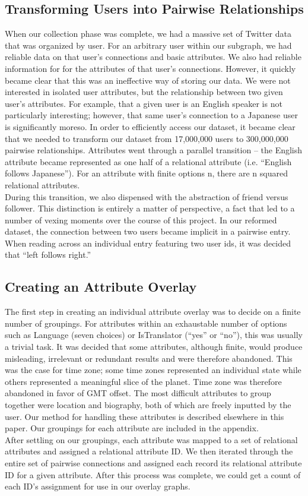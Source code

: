 \subsection{Transforming Users into Pairwise Relationships}
When our collection phase was complete, we had a massive set of Twitter data that was organized by user.  For an arbitrary user within our subgraph, we had reliable data on that user's connections and basic attributes.  We also had reliable information for for the attributes of that user's connections.  However, it quickly became clear that this was an ineffective way of storing our data.  We were not interested in isolated user attributes, but the relationship between two given user's attributes.  For example, that a given user is an English speaker is not particularly interesting; however, that same user's connection to a Japanese user is significantly moreso.  In order to efficiently access our dataset, it became clear that we needed to transform our dataset from 17,000,000 users to 300,000,000 pairwise relationships.  Attributes went through a parallel transition -- the English attribute became represented as one half of a relational attribute (i.e. ``English follows Japanese'').  For an attribute with finite options n, there are n squared relational attributes.
\\
During this transition, we also dispensed with the abstraction of friend versus follower.  This distinction is entirely a matter of perspective, a fact that led to a number of vexing moments over the course of this project.  In our reformed dataset, the connection between two users became implicit in a pairwise entry.  When reading across an individual entry featuring two user ids, it was decided that ``left follows right.'' 

\subsection{Creating an Attribute Overlay}
The first step in creating an individual attribute overlay was to decide on a finite number of groupings.  For attributes within an exhaustable number of options such as Language (seven choices) or  IsTranslator (``yes'' or ``no''), this was usually a trivial task.  It was decided that some attributes, although finite, would produce misleading, irrelevant or redundant results and were therefore abandoned.  This was the case for time zone; some time zones represented an individual state while others represented a meaningful slice of the planet.  Time zone was therefore abandoned in favor of GMT offset.  The most difficult attributes to group together were location and biography, both of which are freely inputted by the user.  Our method for handling these attributes is described elsewhere in this paper.  Our groupings for each attribute are included in the appendix.
\\
After settling on our groupings, each attribute was mapped to a set of relational attributes and assigned a relational attribute ID.  We then iterated through the entire set of pairwise connections and assigned each record its relational attribute ID for a given attribute.  After this process was complete, we could get a count of each ID's assignment for use in our overlay graphs.

